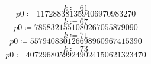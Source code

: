 \documentclass[11pt,a4paper,fleqn]{article}
\begin{document}
\begin{enumerate}[1.]
\begin{enumerate}[(a)]
\begin{flushleft}
\begin{mdframed}
                    \begin{dmath*}
                        k \coloneqq 61
                    \end{dmath*}
                    \vspace{-\bigskipamount}
                    \begin{dmath*}
                        \mathit{p0} \coloneqq 117288381359406970983270
                    \end{dmath*}
                    \vspace{-\bigskipamount}
                    \begin{dmath*}
                        k \coloneqq 67
                    \end{dmath*}
                    \vspace{-\bigskipamount}
                    \begin{dmath*}
                        \mathit{p0} \coloneqq 7858321551080267055879090
                    \end{dmath*}
                    \vspace{-\bigskipamount}
                    \begin{dmath*}
                        k \coloneqq 71
                    \end{dmath*}
                    \vspace{-\bigskipamount}
                    \begin{dmath*}
                        \mathit{p0} \coloneqq 557940830126698960967415390
                    \end{dmath*}
                    \vspace{-\bigskipamount}
                    \begin{dmath*}
                        k \coloneqq 73
                    \end{dmath*}
                    \vspace{-\bigskipamount}
                    \begin{dmath*}
                        \mathit{p0} \coloneqq 40729680599249024150621323470
                    \end{dmath*}
                    \vspace{-\bigskipamount}
                    \begin{dmath*}

\end{dmath*}
\end{mdframed}
\end{flushleft}
\end{enumerate}
\end{enumerate}
\end{document}
